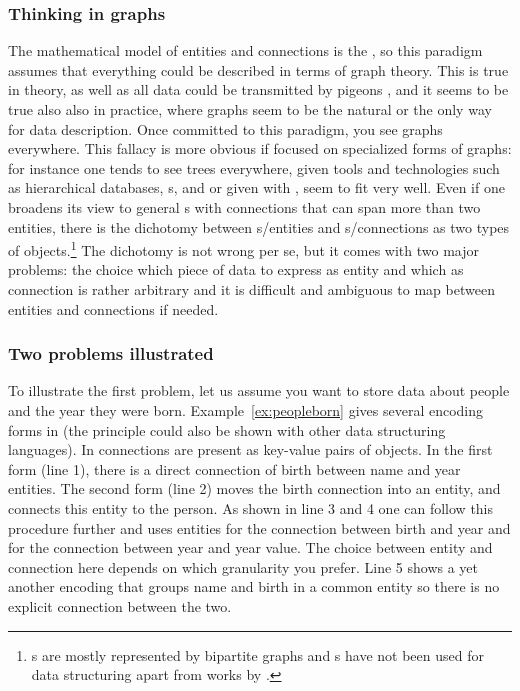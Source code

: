 \subsubsection{Thinking in graphs}

The mathematical model of entities and connections is the , so this
paradigm assumes that everything could be described in terms of graph theory.
This is true in theory, as well as all data could be transmitted by pigeons
\cite{Waitzman1990}, and it seems to be true also also in practice, where
graphs seem to be the natural or the only way for data description.  Once
committed to this paradigm, you see graphs everywhere. This fallacy is more
obvious if focused on specialized forms of graphs: for instance one tends to
see trees everywhere, given tools and technologies such as hierarchical
databases, s, and  or given  with ,  seem to fit very well. 
Even if one broadens its view to general s with connections
that can span more than two entities, there is the dichotomy between
s/entities and s/connections as two types of
objects.\footnote{s are mostly represented by bipartite graphs
and s have not been used for data structuring
apart from works by \textcite{Goertzel2006}.} The dichotomy is not wrong per
se, but it comes with two major problems: the choice which piece of data
to express as entity and which as connection is rather arbitrary and it is
difficult and ambiguous to map between entities and connections if needed.

\subsubsection{Two problems illustrated}

To illustrate the first problem, let us assume you want to store data about
people and the year they were born. Example~\ref{ex:peopleborn} gives several
encoding forms in  (the principle could also be shown with other
data structuring languages). In  connections are present as key-value
pairs of objects. In the first form (line 1), there is a direct connection of
birth between name and year entities. The second form (line 2) moves the birth
connection into an entity, and connects this entity to the person. As shown in
line 3 and 4 one can follow this procedure further and uses entities for the
connection between birth and year and for the connection between year and year
value. The choice between entity and connection here depends on which
granularity you prefer. Line 5 shows a yet another encoding that groups name
and birth in a common entity so there is no explicit connection between the
two.

